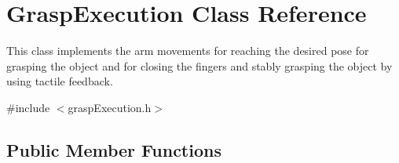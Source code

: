 \section{Grasp\+Execution Class Reference}
\label{classGraspExecution}


This class implements the arm movements for reaching the desired pose for grasping the object and for closing the fingers and stably grasping the object by using tactile feedback.  




{\ttfamily \#include $<$grasp\+Execution.\+h$>$}

\subsection*{Public Member Functions}

